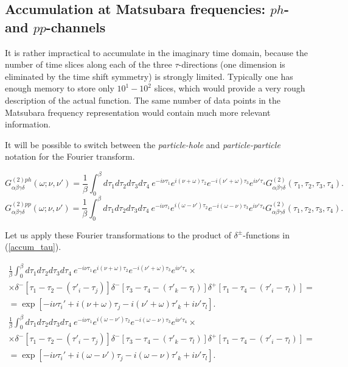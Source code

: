 \documentclass[a4paper,12pt]{article}
\renewcommand{\t}{\ensuremath{\tau}}
\newcommand{\w}{\ensuremath{\omega}}
\begin{document}
\subsection{Accumulation at Matsubara frequencies: $ph$- and $pp$-channels}

It is rather impractical to accumulate in the imaginary time domain, because the number of
time slices along each of the three $\t$-directions (one dimension is eliminated by
the time shift symmetry) is strongly limited. Typically one has enough memory to store only
$10^1-10^2$ slices, which would provide a very rough description of the actual function.
The same number of data points in the Matsubara frequency representation would contain
much more relevant information.

It will be possible to switch between the \textit{particle-hole} and \textit{particle-particle}
notation for the Fourier transform.

\begin{equation}
	G^{(2)ph}_{\alpha\beta\gamma\delta}(\w;\nu,\nu') =
	\frac{1}{\beta}\int_0^\beta d\t_1d\t_2d\t_3d\t_4\
	e^{-i\nu\t_1} e^{i(\nu+\w)\t_2} e^{-i(\nu'+\w)\t_3} e^{i\nu'\tau_4}
	G^{(2)}_{\alpha\beta\gamma\delta}(\t_1,\t_2,\t_3,\t_4).
\end{equation}
\begin{equation}
	G^{(2)pp}_{\alpha\beta\gamma\delta}(\w;\nu,\nu') =
	\frac{1}{\beta}\int_0^\beta d\t_1d\t_2d\t_3d\t_4\
	e^{-i\nu\t_1} e^{i(\w-\nu')\t_2} e^{-i(\w-\nu)\t_3} e^{i\nu'\tau_4}
	G^{(2)}_{\alpha\beta\gamma\delta}(\t_1,\t_2,\t_3,\t_4).
\end{equation}

Let us apply these Fourier transformations to the product of $\delta^\pm$-functions in
(\ref{accum_tau}).

\begin{multline}\label{ph_fourier_kernel}
	\frac{1}{\beta}\int_0^\beta d\t_1d\t_2d\t_3d\t_4\
	e^{-i\nu\t_1} e^{i(\nu+\w)\t_2} e^{-i(\nu'+\w)\t_3} e^{i\nu'\tau_4}\times\\\times
    \delta^-[\t_1 - \t_2 -(\t'_i-\t_j)]\delta^-[\t_3-\t_4-(\t'_k-\t_l)]
    \delta^+[\t_1-\t_4-(\tau'_i-\tau_l)] =\\=
    \exp[-i\nu\t_i' +i(\nu+\w)\t_j - i(\nu'+\w)\t'_k + i\nu'\t_l].
\end{multline}
\begin{multline}\label{pp_fourier_kernel}
	\frac{1}{\beta}\int_0^\beta d\t_1d\t_2d\t_3d\t_4\
	e^{-i\nu\t_1} e^{i(\w-\nu')\t_2} e^{-i(\w-\nu)\t_3} e^{i\nu'\tau_4}\times\\\times
	\delta^-[\t_1 - \t_2 -(\t'_i-\t_j)]\delta^-[\t_3-\t_4-(\t'_k-\t_l)]
	\delta^+[\t_1-\t_4-(\tau'_i-\tau_l)] =\\=
	\exp[-i\nu\t_i' +i(\w-\nu')\t_j - i(\w-\nu)\t'_k + i\nu'\t_l].
\end{multline}
\end{document}
